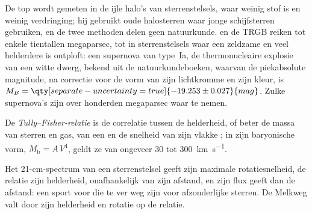 De top wordt gemeten in de ijle halo's van sterrenstelsels, waar weinig stof
is en weinig verdringing; hij gebruikt oude halosterren waar 
jonge schijfsterren gebruiken, en de twee methoden delen geen natuurkunde.  en
de TRGB reiken tot enkele tientallen megaparsec, tot in sterrenstelsels waar een
zeldzame en veel helderdere  is ontploft: een supernova van type~Ia,
de thermonucleaire explosie van een witte dwerg, bekend uit de natuurkundeboeken,
waarvan de piekabsolute magnitude, na correctie voor de
vorm van zijn lichtkromme en zijn kleur, is
$M_B = \qty[separate-uncertainty=true]{-19.253 \pm 0.027}{mag}$. Zulke
supernova's zijn over honderden megaparsec waar te nemen.

\begin{definition}\label{def:b3:milky-way-galaxies:tully-fisher}
De \emph{Tully--Fisher-relatie} is de
correlatie tussen de helderheid, of beter de massa van sterren en gas,
van een  en de snelheid van zijn vlakke ; in zijn
baryonische vorm, $M_\mathrm{b} = A\,V^4$, geldt ze van ongeveer 30 tot
\qty{300}{km.s^{-1}}.
\end{definition}

Het 21-cm-spectrum van een sterrenstelsel geeft zijn maximale rotatiesnelheid, de
relatie zijn helderheid, onafhankelijk van zijn afstand, en zijn flux
geeft dan de afstand: een sport voor  die te ver weg zijn voor afzonderlijke
sterren. De Melkweg valt door zijn helderheid en rotatie op de relatie.

